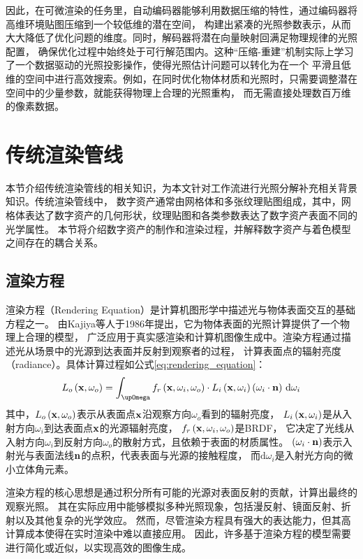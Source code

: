 因此，在可微渲染的任务里，自动编码器能够利用数据压缩的特性，通过编码器将高维环境贴图压缩到一个较低维的潜在空间，
构建出紧凑的光照参数表示，从而大大降低了优化问题的维度。同时，解码器将潜在向量映射回满足物理规律的光照配置，
确保优化过程中始终处于可行解范围内。这种“压缩-重建”机制实际上学习了一个数据驱动的光照投影操作，使得光照估计问题可以转化为在一个
平滑且低维的空间中进行高效搜索。例如，在同时优化物体材质和光照时，只需要调整潜在空间中的少量参数，就能获得物理上合理的光照重构，
而无需直接处理数百万维的像素数据。

\section{传统渲染管线}
本节介绍传统渲染管线的相关知识，为本文针对工作流进行光照分解补充相关背景知识。传统渲染管线中，
数字资产通常由网格体和多张纹理贴图组成，其中，网格体表达了数字资产的几何形状，纹理贴图和各类参数表达了数字资产表面不同的光学属性。
本节将介绍数字资产的制作和渲染过程，并解释数字资产与着色模型之间存在的耦合关系。

\subsection{渲染方程}


渲染方程（Rendering Equation）是计算机图形学中描述光与物体表面交互的基础方程之一。
由Kajiya等人于1986年提出\cite{Kajiya_1986}，它为物体表面的光照计算提供了一个物理上合理的模型，
广泛应用于真实感渲染和计算机图像生成中。渲染方程通过描述光从场景中的光源到达表面并反射到观察者的过程，
计算表面点的辐射亮度（radiance）。具体计算过程如公式\eqref{eq:rendering_equation}：
\begin{equation}
  \label{eq:rendering_equation}
  L_o\left({\bf{x}},\omega_o\right)=\int_{\upOmega}f_r\left({\bf{x}},\omega_i,\omega_o\right)\cdot L_i\left({\bf{x}},
  \omega_i\right)\left(\omega_i\cdot\mathbf{n}\right)\,\mathrm{d}\omega_i
\end{equation}
其中，$L_o\left({\bf{x}},\omega_o\right)$表示从表面点$\bf{x}$沿观察方向$\omega_o$看到的辐射亮度，
$L_i\left({\bf{x}},\omega_i\right)$是从入射方向$\omega_i$到达表面点$\bf{x}$的光源辐射亮度，
$f_r\left({\bf{x}},\omega_i,\omega_o\right)$是BRDF，
它决定了光线从入射方向$\omega_i$到反射方向$\omega_o$的散射方式，且依赖于表面的材质属性。
$\left(\omega_i\cdot\bf{n}\right)$表示入射光与表面法线$\bf{n}$的点积，代表表面与光源的接触程度，
而$\mathrm{d}\omega_i$是入射光方向的微小立体角元素。

渲染方程的核心思想是通过积分所有可能的光源对表面反射的贡献，计算出最终的观察光照。
其在实际应用中能够模拟多种光照现象，包括漫反射、镜面反射、折射以及其他复杂的光学效应。
然而，尽管渲染方程具有强大的表达能力，但其高计算成本使得在实时渲染中难以直接应用。
因此，许多基于渲染方程的模型需要进行简化或近似，以实现高效的图像生成。

